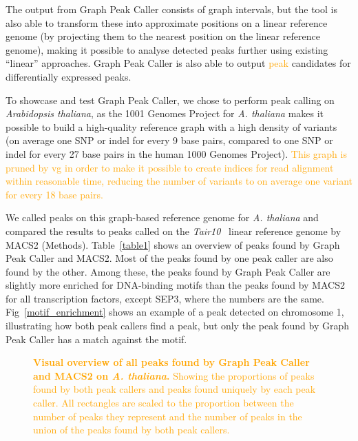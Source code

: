 \documentclass[10pt,letterpaper]{article}
\newcommand{\revision}[1]{\textcolor{orange}{#1}}
\begin{document}
The output from Graph Peak Caller consists of graph intervals, but the tool is also able to transform these into approximate positions on a linear reference genome (by projecting them to the nearest position on the linear reference genome), making it possible to analyse detected peaks further using existing “linear” approaches.
Graph Peak Caller is also able to output \revision{peak} candidates for differentially expressed peaks.

To showcase and test Graph Peak Caller, we chose to perform peak calling on \emph{Arabidopsis thaliana}, as the 1001 Genomes Project for \emph{A. thaliana} makes it possible to build a high-quality reference graph with a high density of variants (on average one SNP or indel for every 9 base pairs, compared to one SNP or indel for every 27 base pairs in the human 1000 Genomes Project). \revision{This graph is pruned by vg in order to make it possible to create indices for read alignment within reasonable time, reducing the number of variants to on average one variant for every 18 base pairs.}


We called peaks on this graph-based reference genome for \emph{A. thaliana} and compared the results to peaks called on the \emph{Tair10}~\cite{tair} linear reference genome by MACS2 (Methods).
Table~\ref{table1} shows an overview of peaks found by Graph Peak Caller and MACS2.
Most of the peaks found by one peak caller are also found by the other.
Among these, the peaks found by Graph Peak Caller are slightly more enriched for DNA-binding motifs than the peaks found by MACS2 for all transcription factors, except SEP3, where the numbers are the same.
Fig~\ref{motif_enrichment} shows an example of a peak detected on chromosome 1, illustrating how both peak callers find a peak, but only the peak found by Graph Peak Caller has a match against the motif.


\begin{figure}[!h]
 \caption{\revision{{\bf Visual overview of all peaks found by Graph Peak Caller and MACS2 on \emph{A. thaliana}.} Showing the proportions of peaks found by both peak callers and peaks found uniquely by each peak caller. All rectangles are scaled to the proportion between the number of peaks they represent and the number of peaks in the union of the peaks found by both peak callers.}}
\label{asdf}
\end{figure}
\end{document}
